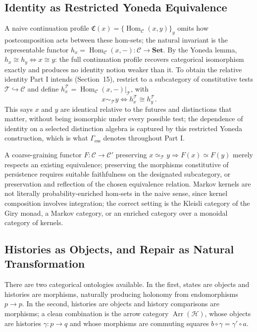\documentclass[11pt]{article}
\begin{document}
\subsection{Identity as Restricted Yoneda Equivalence}

A naive continuation profile $\mathfrak{C}(x) = \{\operatorname{Hom}_{\mathcal{C}}(x,y)\}_y$ omits how postcomposition acts between these hom-sets; the natural invariant is the representable functor $h_x = \operatorname{Hom}_{\mathcal{C}}(x, -) : \mathcal{C} \to \mathbf{Set}$. By the Yoneda lemma, $h_x \cong h_y \iff x \cong y$: the full continuation profile recovers categorical isomorphism exactly and produces no identity notion weaker than it. To obtain the relative identity Part I intends (Section~15), restrict to a subcategory of constitutive tests $\mathcal{T} \hookrightarrow \mathcal{C}$ and define $h_x^{\mathcal{T}} = \operatorname{Hom}_{\mathcal{C}}(x,-)|_{\mathcal{T}}$, with
\[
x \sim_{\mathcal{T}} y \iff h_x^{\mathcal{T}} \cong h_y^{\mathcal{T}}.
\]
This says $x$ and $y$ are identical relative to the futures and distinctions that matter, without being isomorphic under every possible test; the dependence of identity on a selected distinction algebra is captured by this restricted Yoneda construction, which is what $\Gamma_{\mathrm{ess}}$ denotes throughout Part I.

A coarse-graining functor $F : \mathcal{C} \to \mathcal{C}'$ preserving $x \simeq_{\mathcal{T}} y \Rightarrow F(x) \simeq F(y)$ merely respects an existing equivalence; preserving the morphisms constitutive of persistence requires suitable faithfulness on the designated subcategory, or preservation and reflection of the chosen equivalence relation. Markov kernels are not literally probability-enriched hom-sets in the naive sense, since kernel composition involves integration; the correct setting is the Kleisli category of the Giry monad, a Markov category, or an enriched category over a monoidal category of kernels.

\subsection{Histories as Objects, and Repair as Natural Transformation}

There are two categorical ontologies available. In the first, states are objects and histories are morphisms, naturally producing holonomy from endomorphisms $p \to p$. In the second, histories are objects and history comparisons are morphisms; a clean combination is the arrow category $\operatorname{Arr}(\mathcal{H})$, whose objects are histories $\gamma : p \to q$ and whose morphisms are commuting squares $b \circ \gamma = \gamma' \circ a$.
\end{document}
